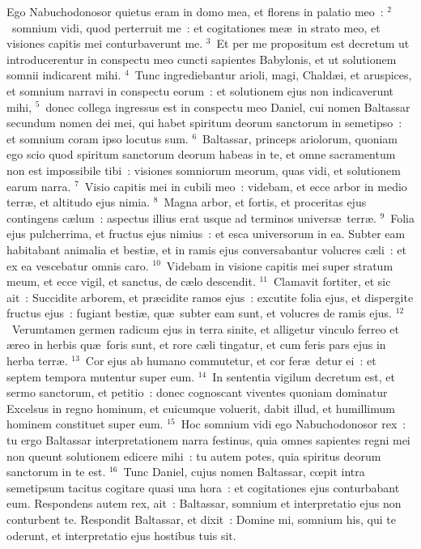 \bchapter
\lettrine[lines=3,image=true,loversize=0.05,lraise=-0.03]{E}{}go Nabuchodonosor quietus eram in domo mea, et florens in palatio meo~:
${}^{2}$~somnium vidi, quod perterruit me~: et cogitationes me\ae\ in strato meo, et visiones capitis mei conturbaverunt me.
${}^{3}$~Et per me propositum est decretum ut introducerentur in conspectu meo cuncti sapientes Babylonis, et ut solutionem somnii indicarent mihi.
${}^{4}$~Tunc ingrediebantur arioli, magi, Chald\ae i, et aruspices, et somnium narravi in conspectu eorum~: et solutionem ejus non indicaverunt mihi,
${}^{5}$~donec collega ingressus est in conspectu meo Daniel, cui nomen Baltassar secundum nomen dei mei, qui habet spiritum deorum sanctorum in semetipso~: et somnium coram ipso locutus sum.
${}^{6}$~Baltassar, princeps ariolorum, quoniam ego scio quod spiritum sanctorum deorum habeas in te, et omne sacramentum non est impossibile tibi~: visiones somniorum meorum, quas vidi, et solutionem earum narra.
${}^{7}$~Visio capitis mei in cubili meo~: videbam, et ecce arbor in medio terr\ae , et altitudo ejus nimia.
${}^{8}$~Magna arbor, et fortis, et proceritas ejus contingens c\ae lum~: aspectus illius erat usque ad terminos univers\ae\ terr\ae .
${}^{9}$~Folia ejus pulcherrima, et fructus ejus nimius~: et esca universorum in ea. Subter eam habitabant animalia et besti\ae , et in ramis ejus conversabantur volucres c\ae li~: et ex ea vescebatur omnis caro.
${}^{10}$~Videbam in visione capitis mei super stratum meum, et ecce vigil, et sanctus, de c\ae lo descendit.
${}^{11}$~Clamavit fortiter, et sic ait~: Succidite arborem, et pr\ae cidite ramos ejus~: excutite folia ejus, et dispergite fructus ejus~: fugiant besti\ae , qu\ae\ subter eam sunt, et volucres de ramis ejus.
${}^{12}$~Verumtamen germen radicum ejus in terra sinite, et alligetur vinculo ferreo et \ae reo in herbis qu\ae\ foris sunt, et rore c\ae li tingatur, et cum feris pars ejus in herba terr\ae .
${}^{13}$~Cor ejus ab humano commutetur, et cor fer\ae\ detur ei~: et septem tempora mutentur super eum.
${}^{14}$~In sententia vigilum decretum est, et sermo sanctorum, et petitio~: donec cognoscant viventes quoniam dominatur Excelsus in regno hominum, et cuicumque voluerit, dabit illud, et humillimum hominem constituet super eum.
${}^{15}$~Hoc somnium vidi ego Nabuchodonosor rex~: tu ergo Baltassar interpretationem narra festinus, quia omnes sapientes regni mei non queunt solutionem edicere mihi~: tu autem potes, quia spiritus deorum sanctorum in te est.
${}^{16}$~Tunc Daniel, cujus nomen Baltassar, cœpit intra semetipsum tacitus cogitare quasi una hora~: et cogitationes ejus conturbabant eum. Respondens autem rex, ait~: Baltassar, somnium et interpretatio ejus non conturbent te. Respondit Baltassar, et dixit~: Domine mi, somnium his, qui te oderunt, et interpretatio ejus hostibus tuis sit.
